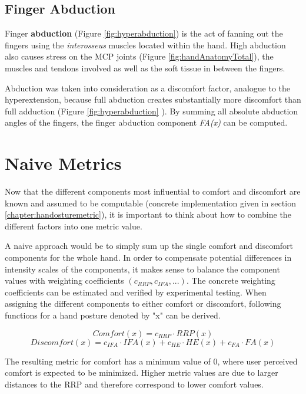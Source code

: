\subsection{Finger Abduction}

Finger \textbf{abduction} (Figure \ref{fig:hyperabduction}) is the act of fanning out the fingers using the \textit{interosseus} muscles located within the hand. 
High abduction also causes stress on the MCP joints (Figure \ref{fig:handAnatomyTotal}), the muscles and tendons involved as well as the soft tissue in between the fingers.

Abduction was taken into consideration as a discomfort factor, analogue to the hyperextension, because full abduction creates substantially more discomfort than full adduction (Figure \ref{fig:hyperabduction} ). By summing all absolute abduction angles of the fingers, the finger abduction component \textit{FA(x)} can be computed.

\section{Naive Metrics}

Now that the different components most influential to comfort and discomfort are known and assumed to be computable (concrete implementation given in section \ref{chapter:handosturemetric}), it is important to think about how to combine the different factors into one metric value. 

A naive approach would be to simply sum up the single comfort and discomfort components for the whole hand. In order to compensate potential differences in intensity scales of the components, it makes sense to balance the component values with weighting coefficients \begin{math}(c_{RRP}, c_{IFA}, ...)\end{math}. The concrete weighting coefficients can be estimated and verified by experimental testing. When assigning the different components to either comfort or discomfort, following functions for a hand posture denoted by "x" can be derived.

	\[
	Comfort(x) = c_{RRP}\cdot RRP(x)
	\]
	\[
	Discomfort(x) = c_{IFA}\cdot IFA(x)  +  c_{HE}\cdot HE(x)  +  c_{FA}\cdot FA(x)
	\]
	\vspace{5pt}
	
	
The resulting metric for comfort has a minimum value of 0, where user perceived comfort is expected to be minimized. Higher metric values are due to larger distances to the RRP and therefore correspond to lower comfort values.

